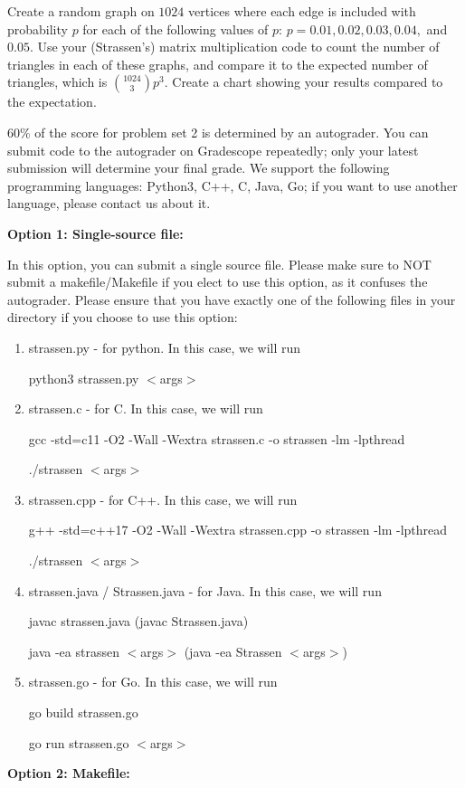 \documentclass[11pt]{article}
\begin{document}
\begin{enumerate}
Create a random graph on $1024$ vertices where each edge is included with probability $p$ for each of the following values of $p$:  $p = 0.01, 0.02, 0.03, 0.04,$ and $0.05$.  Use your (Strassen's) matrix multiplication code to count the number of triangles in each of these graphs, and compare it to the expected number of triangles, which is ${1024 \choose 3} p^3$.  Create a chart showing your results compared to the expectation.  

\end{enumerate}


60\% of the score for problem set 2 is determined by an autograder. You can submit code to the autograder on Gradescope repeatedly; only your latest submission will determine your final grade. We support the following programming languages: Python3, C++, C, Java, Go; if you want to use another language, please contact us about it. 

 {\bf {\Large Option 1: Single-source file:}} 

In this option, you can submit a single source file. Please make sure to NOT submit a makefile/Makefile if you elect to use this option, as it confuses the autograder. Please ensure that you have exactly one of the following files in your directory if you choose to use this option: 
\begin{enumerate}
\item strassen.py - for python. In this case, we will run

python3 strassen.py $<$args$>$
\item strassen.c - for C. In this case, we will run 

gcc -std=c11 -O2 -Wall -Wextra strassen.c -o strassen -lm -lpthread

./strassen $<$args$>$
\item strassen.cpp - for C++. In this case, we will run 

g++ -std=c++17 -O2 -Wall -Wextra strassen.cpp -o strassen -lm -lpthread

./strassen $<$args$>$

\item strassen.java / Strassen.java - for Java. In this case, we will run 

javac strassen.java (javac Strassen.java)

java -ea strassen $<$args$>$ (java -ea Strassen $<$args$>$) 
\item strassen.go - for Go. In this case, we will run 

go build strassen.go

go run strassen.go $<$args$>$
\end{enumerate}
 {\bf {\Large Option 2: Makefile:}} 
\end{document}
